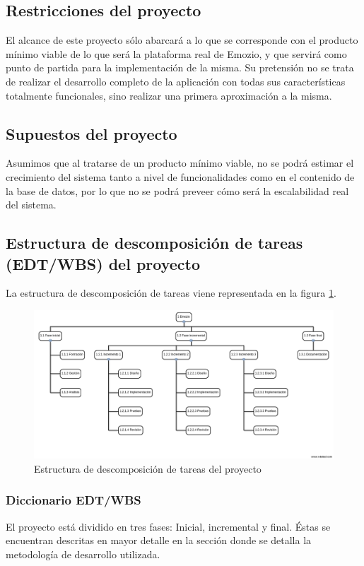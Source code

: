 \subsection{Restricciones del proyecto}
El alcance de este proyecto sólo abarcará a lo que se corresponde con el producto mínimo viable de lo que será la plataforma real de Emozio, y que servirá como punto de partida para la implementación de la misma. Su pretensión no se trata de realizar el desarrollo completo de la aplicación con todas sus características totalmente funcionales, sino realizar una primera aproximación a la misma.

\subsection{Supuestos del proyecto}
Asumimos que al tratarse de un producto mínimo viable, no se podrá estimar el crecimiento del sistema tanto a nivel de funcionalidades como en el contenido de la base de datos, por lo que no se podrá preveer cómo será la escalabilidad real del sistema.

\subsection{Estructura de descomposición de tareas (EDT/WBS) del proyecto}
La estructura de descomposición de tareas viene representada en la figura \ref{fig:edt}.

\begin{figure}[htbp] 
    \centering
    \includegraphics[width=1\textwidth]{figuras/edt_v1_en.png}
    \caption{Estructura de descomposición de tareas del proyecto}
    \label{fig:edt}
\end{figure}	

\subsubsection{Diccionario EDT/WBS}
El proyecto está dividido en tres fases: Inicial, incremental y final. Éstas se encuentran descritas en mayor detalle en la sección donde se detalla la metodología de desarrollo utilizada.

